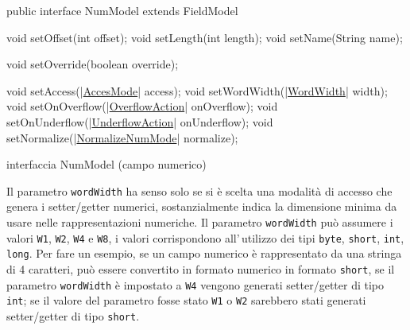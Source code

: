 \documentclass[a4paper,10pt]{report}
\newif\ifesource
\newenvironment{elisting}[1][!htb]
  {\captionsetup{aboveskip=0pt}\begin{listing}[#1]}
  {\end{listing}%
}
\begin{document}
\ifesource
\begin{figure*}[!htb]
\begin{lstlisting}[language=java, 
caption=interfaccia NumModel (campo numerico), 
label=lst:NumModel]
public interface NumModel extends FieldModel {
    void setOffset(int offset);
    void setLength(int length);
    void setName(String name);

    void setOverride(boolean override);

    void setAccess((*\hyperref[lst:AccesMode]{AccesMode}*) access);
    void setWordWidth((*\hyperref[lst:WordWidth]{WordWidth}*) width);
    void setOnOverflow((*\hyperref[lst:OverflowAction]{OverflowAction}*) onOverflow);
    void setOnUnderflow((*\hyperref[lst:UnderflowAction]{UnderflowAction}*) onUnderflow);
    void setNormalize((*\hyperref[lst:NormalizeNumMode]{NormalizeNumMode}*) normalize);
}
\end{lstlisting}\index{NumModel}
\end{figure*}
\else
\begin{elisting}
\begin{javacode}
public interface NumModel extends FieldModel {
    void setOffset(int offset);
    void setLength(int length);
    void setName(String name);

    void setOverride(boolean override);

    void setAccess(|\hyperref[lst:AccesMode]{AccesMode}| access);
    void setWordWidth(|\hyperref[lst:WordWidth]{WordWidth}| width);
    void setOnOverflow(|\hyperref[lst:OverflowAction]{OverflowAction}| onOverflow);
    void setOnUnderflow(|\hyperref[lst:UnderflowAction]{UnderflowAction}| onUnderflow);
    void setNormalize(|\hyperref[lst:NormalizeNumMode]{NormalizeNumMode}| normalize);
}
\end{javacode}
\caption{interfaccia NumModel (campo numerico)}
\label{lst:NumModel}
\end{elisting}
\fi

Il parametro \verb!wordWidth! ha senso solo se si è scelta una modalità di
accesso che genera i setter/getter numerici, sostanzialmente indica la 
dimensione minima da usare nelle rappresentazioni numeriche.
Il parametro \verb!wordWidth! può assumere i valori \verb!W1!, \verb!W2!, 
\verb!W4! e \verb!W8!, i valori corrispondono all'\,utilizzo dei tipi
\verb!byte!, \verb!short!, \verb!int!, \verb!!\verb!long!.
Per fare un esempio, se un campo numerico è rappresentato da una stringa di 4 
caratteri, può essere convertito in formato numerico in formato \verb!short!,
se il parametro \verb!wordWidth! è impostato a \verb!W4! vengono generati
setter/getter di tipo \verb!int!; se il valore del parametro fosse stato 
\verb!W1! o  \verb!W2! sarebbero stati generati setter/getter di tipo 
\verb!short!.
\end{document}
